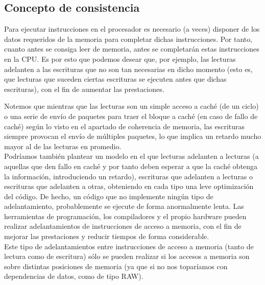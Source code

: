 \subsection{Concepto de consistencia}
Para ejecutar instrucciones en el procesador es necesario (a veces) disponer de los datos requeridos de la memoria para completar dichas instrucciones. Por tanto, cuanto antes se consiga leer de memoria, antes se completarán estas instrucciones en la CPU\@. Es por esto que podemos desear que, por ejemplo, las lecturas adelanten a las escrituras que no son tan necesarias en dicho momento (esto es, que lecturas que suceden ciertas escrituras se ejecuten antes que dichas escrituras), con el fin de aumentar las prestaciones. 

Notemos que mientras que las lecturas son un simple acceso a caché (de un ciclo) o una serie de envío de paquetes para traer el bloque a caché (en caso de fallo de caché) según lo visto en el apartado de coherencia de memoria, las escrituras siempre provocan el envío de múltiples paquetes, lo que implica un retardo mucho mayor al de las lecturas en promedio.\\

Podríamos también plantear un modelo en el que lecturas adelanten a lecturas (a aquellas que den fallo en caché y por tanto deben esperar a que la caché obtenga la información, introduciendo un retardo), escrituras que adelanten a lecturas o escrituras que adelanten a otras, obteniendo en cada tipo una leve optimización del código. De hecho, un código que no implemente ningún tipo de adelantamiento, probablemente se ejecute de forma anormalmente lenta. Las herramientas de programación, los compiladores y el propio hardware pueden realizar adelantamientos de instrucciones de acceso a memoria, con el fin de mejorar las prestaciones y reducir tiempos de forma considerable.\\

Este tipo de adelantamientos entre instrucciones de acceso a memoria (tanto de lectura como de escritura) sólo se pueden realizar si los accesos a memoria son sobre distintas posiciones de memoria (ya que si no nos toparíamos con dependencias de datos, como de tipo RAW).\\

